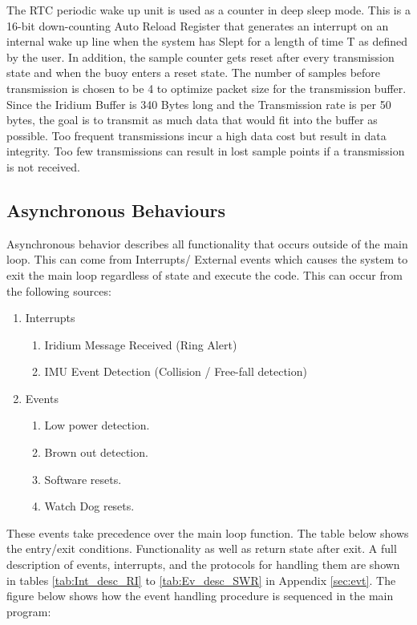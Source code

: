 The RTC periodic wake up unit is used as a counter in deep sleep mode. This is a 16-bit down-counting Auto Reload Register that generates an interrupt on an internal wake up line when the system has Slept for a length of time T as defined by the user. In addition, the sample counter gets reset after every transmission state and when the buoy enters a reset state. The number of samples before transmission is chosen to be 4 to optimize packet size for the transmission buffer. Since the Iridium Buffer is 340 Bytes long and the Transmission rate is per 50 bytes, the goal is to transmit as much data that would fit into the buffer as possible. Too frequent transmissions incur a high data cost but result in data integrity. Too few transmissions can result in lost sample points if a transmission is not received.

\subsection{Asynchronous Behaviours}
Asynchronous behavior describes all functionality that occurs outside of the main loop. This can come from Interrupts/ External events which causes the system to exit the main loop regardless of state and execute the code. This can occur from the following sources:

\begin{enumerate}
    \item Interrupts
    \begin{enumerate}
        \item Iridium Message Received (Ring Alert)
        \item IMU Event Detection (Collision / Free-fall detection)
    \end{enumerate}
    \item Events
    \begin{enumerate}
        \item Low power detection.
        \item Brown out detection.
        \item Software resets.
        \item Watch Dog resets.
    \end{enumerate}
\end{enumerate}

These events take precedence over the main loop function. The table below shows the entry/exit conditions. Functionality as well as return state after exit. A full description of events, interrupts, and the protocols for handling them are shown in tables \ref{tab:Int_desc_RI} to \ref{tab:Ev_desc_SWR} in Appendix \ref{sec:evt}. The figure below shows how the event handling procedure is sequenced in the main program:

